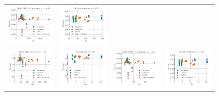 \begin{figure}
\begin{tabular}{@{\hskip -0.0in}c@{\hskip -0.0in}c@{\hskip -0.0in}c@{\hskip -0.0in}c@{\hskip -0.0in}}
		\includegraphics[width=.245\linewidth]{figures/glove400k_sentiment_sst_test-acc_vs_gram-large-dim-delta2-1_linx_stoc.pdf} &
		\includegraphics[width=.245\linewidth]{figures/fasttext1m_sentiment_sst_test-acc_vs_gram-large-dim-delta2-1_linx_stoc.pdf} \\[-1em]
		\includegraphics[width=.245\linewidth]{figures/glove400k_qa_best-f1_vs_gram-large-dim-delta2-2_linx_stoc.pdf} &
		\includegraphics[width=.245\linewidth]{figures/fasttext1m_qa_best-f1_vs_gram-large-dim-delta2-2_linx_stoc.pdf} &
		\includegraphics[width=.245\linewidth]{figures/glove400k_sentiment_sst_test-acc_vs_gram-large-dim-delta2-2_linx_stoc.pdf} &
		\includegraphics[width=.245\linewidth]{figures/fasttext1m_sentiment_sst_test-acc_vs_gram-large-dim-delta2-2_linx_stoc.pdf} \\[-1em]

\end{tabular}
\end{figure}
